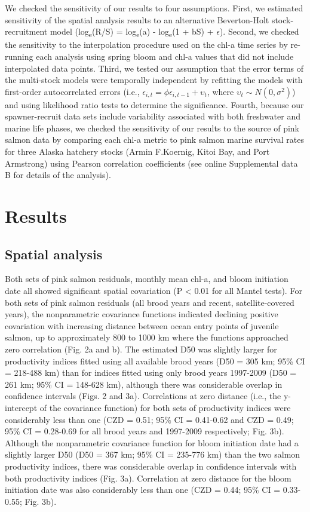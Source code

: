 We checked the sensitivity of our results to four assumptions. First, we
estimated sensitivity of the spatial analysis results to an alternative
Beverton-Holt stock-recruitment model \citep{Beverton1957a}
(log\textsubscript{e}(R/S) = log\textsubscript{e}(a) - log\textsubscript{e}(1 +
bS) + \(\epsilon\)). Second, we checked the sensitivity to the interpolation
procedure used on the chl-a time series by re-running each analysis using spring
bloom and chl-a values that did not include interpolated data points. Third, we
tested our assumption that the error terms of the multi-stock models were
temporally independent by refitting the models with first-order autocorrelated
errors (i.e., \(\epsilon_{i,t} = \phi\epsilon_{i,t-1} + \upsilon_t\), where
\(\upsilon_t \sim N(0, \sigma^2)\)) and using likelihood ratio tests to
determine the significance. Fourth, because our spawner-recruit data sets
include variability associated with both freshwater and marine life phases, we
checked the sensitivity of our results to the source of pink salmon data by
comparing each chl-a metric to pink salmon marine survival rates for three
Alaska hatchery stocks (Armin F.Koernig, Kitoi Bay, and Port Armstrong) using
Pearson correlation coefficients (see online Supplemental data B for details of
the analysis).


\section{Results}

\subsection{Spatial analysis}

Both sets of pink salmon residuals, monthly mean chl-a, and bloom initiation
date all showed significant spatial covariation (P \textless{} 0.01 for all
Mantel tests). For both sets of pink salmon residuals (all brood years and
recent, satellite-covered years), the nonparametric covariance functions
indicated declining positive covariation with increasing distance between ocean
entry points of juvenile salmon, up to approximately 800 to 1000 km where the
functions approached zero correlation (Fig. 2a and b). The estimated D50 was
slightly larger for productivity indices fitted using all available brood years
(D50 = 305 km; 95\% CI = 218-488 km) than for indices fitted using only brood
years 1997-2009 (D50 = 261 km; 95\% CI = 148-628 km), although there was
considerable overlap in confidence intervals (Figs. 2 and 3a). Correlations at
zero distance (i.e., the y-intercept of the covariance function) for both sets
of productivity indices were considerably less than one (CZD = 0.51; 95\% CI =
0.41-0.62 and CZD = 0.49; 95\% CI = 0.28-0.69 for all brood years and 1997-2009
respectively; Fig. 3b). Although the nonparametric covariance function for bloom
initiation date had a slightly larger D50 (D50 = 367 km; 95\% CI = 235-776 km)
than the two salmon productivity indices, there was considerable overlap in
confidence intervals with both productivity indices (Fig. 3a). Correlation at
zero distance for the bloom initiation date was also considerably less than one
(CZD = 0.44; 95\% CI = 0.33-0.55; Fig. 3b).

